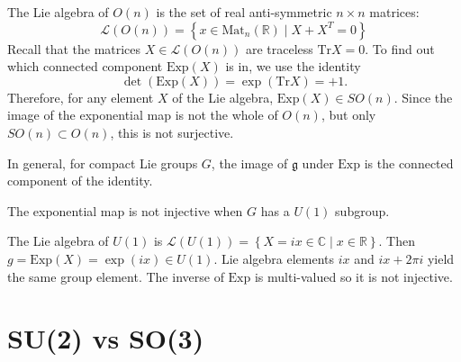 \begin{example}[$G= O(n)$]
  The Lie algebra of $O(n)$ is the set of real anti-symmetric $n \times n$ matrices:
  \begin{equation}
    \mathscr{L}(O(n)) = \left\{ x \in \text{Mat}_n(\mathbb{R}) \mid X + X^T = 0 \right\}
  \end{equation}
  Recall that the matrices $X \in \mathscr{L}(O(n))$ are traceless $\text{Tr} X = 0$.
  To find out which connected component $\text{Exp}(X)$ is in, we use the identity
  \begin{equation}
    \det(\text{Exp}(X)) = \exp(\text{Tr}X) = +1.
  \end{equation}
  Therefore, for any element $X$ of the Lie algebra, $\text{Exp}(X) \in SO(n)$. Since the image of the exponential map is not the whole of $O(n)$, but only $SO(n) \subset O(n)$, this is not surjective.
\end{example}
\begin{claim}
  In general, for compact Lie groups $G$, the image of $\mathfrak{g}$ under $\text{Exp}$ is the connected component of the identity.
\end{claim}
\begin{claim}
  The exponential map is not injective when $G$ has a $U(1)$ subgroup.
\end{claim}
\begin{example}[$G = U(1)$]
  The Lie algebra of $U(1)$ is $\mathscr{L}(U(1)) = \left\{ X = ix \in \mathbb{C} \mid x \in \mathbb{R} \right\}$. Then $g = \text{Exp}(X) = \exp(ix) \in U(1)$. Lie algebra elements $ix$ and $ix + 2 \pi i$ yield the same group element.
  The inverse of $\text{Exp}$ is multi-valued so it is not injective.
\end{example}

\section{SU(2) vs SO(3)}%
\label{sec:su_2_vs_so_3}

